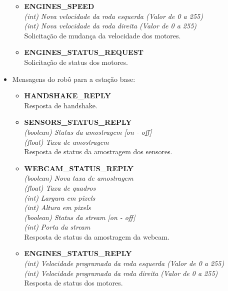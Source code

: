 \begin{itemize}
\begin{itemize}
      \item \textbf{ENGINES\_SPEED} \\
	\textit{(int) Nova velocidade da roda esquerda (Valor de 0 a 255) }\\
	\textit{(int) Nova velocidade da roda direita (Valor de 0 a 255)}\\
	Solicitação de mudança da velocidade dos motores.

      \item \textbf{ENGINES\_STATUS\_REQUEST}\\
	Solicitação de status dos motores.

    \end{itemize}

  \item Mensagens do robô para a estação base:

    \begin{itemize}
      \item \textbf{HANDSHAKE\_REPLY}\\
	Resposta de handshake.

      \item \textbf{SENSORS\_STATUS\_REPLY} \\
	\textit{(boolean) Status da amostragem [on - off] }\\
	\textit{(float) Taxa de amostragem}\\
	Resposta de status da amostragem dos sensores.

      \item \textbf{WEBCAM\_STATUS\_REPLY} \\
	\textit{(boolean) Nova taxa de amostragem }\\
	\textit{(float) Taxa de quadros }\\
	\textit{(int) Largura em pixels }\\
	\textit{(int) Altura em pixels }\\
	\textit{(boolean) Status da stream [on - off] }\\
	\textit{(int) Porta da stream}\\
	Resposta de status da amostragem da webcam.

      \item \textbf{ENGINES\_STATUS\_REPLY} \\
	\textit{(int) Velocidade programada da roda esquerda (Valor de 0 a 255) }\\
	\textit{(int) Velocidade programada da roda direita (Valor de 0 a 255)}\\
	Resposta de status dos motores.


\end{itemize}
\end{itemize}
